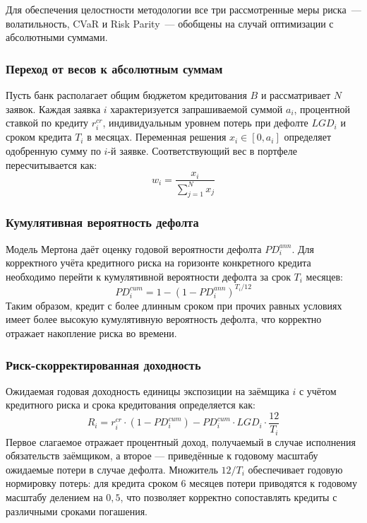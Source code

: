 \documentclass[]{article}
\begin{document}
	Для обеспечения целостности методологии все три рассмотренные меры риска~--- волатильность,
	CVaR и Risk Parity~--- обобщены на случай оптимизации с абсолютными суммами.

	\subsubsection{Переход от весов к абсолютным суммам}

	Пусть банк располагает общим бюджетом кредитования $B$ и рассматривает $N$ заявок. Каждая
	заявка $i$ характеризуется запрашиваемой суммой $a_i$, процентной ставкой по кредиту $r_i^{cr}$,
	индивидуальным уровнем потерь при дефолте $LGD_i$ и сроком кредита $T_i$ в месяцах.
	Переменная решения $x_i \in [0, a_i]$
	определяет одобренную сумму по $i$-й заявке. Соответствующий вес в портфеле пересчитывается как:
	\begin{equation}
		\label{eq:weight_from_amount}
		w_i = \frac{x_i}{\sum_{j=1}^N x_j}
	\end{equation}

	\subsubsection{Кумулятивная вероятность дефолта}

	Модель Мертона даёт оценку годовой вероятности дефолта $PD_i^{ann}$. Для корректного учёта
	кредитного риска на горизонте конкретного кредита необходимо перейти к кумулятивной вероятности
	дефолта за срок $T_i$ месяцев:
	\begin{equation}
		\label{eq:pd_cum}
		PD_i^{cum} = 1 - \left(1 - PD_i^{ann}\right)^{T_i / 12}
	\end{equation}
	Таким образом, кредит с более длинным сроком при прочих равных условиях имеет более высокую
	кумулятивную вероятность дефолта, что корректно отражает накопление риска во времени.

	\subsubsection{Риск-скорректированная доходность}

	Ожидаемая годовая доходность единицы экспозиции на заёмщика $i$ с учётом кредитного риска
	и срока кредитования определяется как:
	\begin{equation}
		\label{eq:risk_adj_return}
		R_i = r_i^{cr} \cdot (1 - PD_i^{cum}) - PD_i^{cum} \cdot LGD_i \cdot \frac{12}{T_i}
	\end{equation}
	Первое слагаемое отражает процентный доход, получаемый в случае исполнения обязательств
	заёмщиком, а второе --- приведённые к годовому масштабу
	ожидаемые потери в случае дефолта. Множитель $12/T_i$ обеспечивает годовую нормировку
	потерь: для кредита сроком 6 месяцев потери приводятся к годовому масштабу делением на $0{,}5$,
	что позволяет корректно сопоставлять кредиты с различными сроками погашения.
\end{document}
